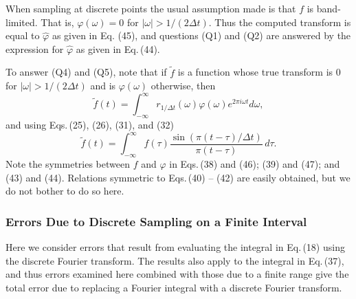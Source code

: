 \documentclass[twoside]{MATH77}
\begin{document}
When sampling at discrete points the usual assumption made is that $f$ is
band-limited. That is, $\varphi (\omega )=0$ for $|\omega |>1/(2\Delta t)$.
Thus the computed transform is equal to $\hat \varphi $ as given in Eq.
(45), and questions (Q1) and (Q2) are answered by the expression for $\hat
\varphi$ as given in Eq.\,(44).

To answer (Q4) and (Q5), note that if $\tilde f$ is a function whose true
transform is 0 for $|\omega |>1/(2\Delta t)$ and is $\varphi (\omega )$
otherwise, then
\begin{equation}\label{O46}
\tilde f(t)=\int_{-\infty }^\infty r_{1/\Delta t}(\omega )\varphi
(\omega )e^{2\pi i\omega t}d\omega ,
\end{equation}
and using Eqs.\,(25), (26), (31), and (32)
\begin{equation}\label{O47}
\tilde f(t)=\int_{-\infty }^\infty f(\tau )\frac{\sin (\pi
(t-\tau )/\Delta t)}{\pi (t-\tau )}\,d\tau .
\end{equation}
Note the symmetries between $f$ and $\varphi $ in Eqs.\,(38) and (46); (39) and
(47); and (43) and (44). Relations symmetric to Eqs.\,(40) -- (42) are easily
obtained, but we do not bother to do so here.

\subsubsection{Errors Due to Discrete Sampling on a Finite Interval}

Here we consider errors that result from evaluating the integral in Eq.\,(18)
using the discrete Fourier transform. The results also apply to the integral
in Eq.\,(37), and thus errors examined here combined with those due to a
finite range give the total error due to replacing a Fourier integral with a
discrete Fourier transform.
\end{document}
